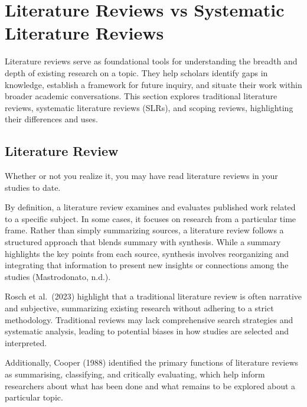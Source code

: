 \documentclass[
  letterpaper,
  DIV=11,
  numbers=noendperiod]{scrreprt}
\begin{document}

\chapter*{Literature Reviews vs Systematic Literature
Reviews}\label{literature-reviews-vs-systematic-literature-reviews}


Literature reviews serve as foundational tools for understanding the
breadth and depth of existing research on a topic. They help scholars
identify gaps in knowledge, establish a framework for future inquiry,
and situate their work within broader academic conversations. This
section explores traditional literature reviews, systematic literature
reviews (SLRs), and scoping reviews, highlighting their differences and
uses.

\section*{Literature Review}\label{literature-review}


Whether or not you realize it, you may have read literature reviews in
your studies to date.

By definition, a literature review examines and evaluates published work
related to a specific subject. In some cases, it focuses on research
from a particular time frame. Rather than simply summarizing sources, a
literature review follows a structured approach that blends summary with
synthesis. While a summary highlights the key points from each source,
synthesis involves reorganizing and integrating that information to
present new insights or connections among the studies (Mastrodonato,
n.d.).

Rosch et al.~(2023) highlight that a traditional literature review is
often narrative and subjective, summarizing existing research without
adhering to a strict methodology. Traditional reviews may lack
comprehensive search strategies and systematic analysis, leading to
potential biases in how studies are selected and interpreted.

Additionally, Cooper (1988) identified the primary functions of
literature reviews as summarising, classifying, and critically
evaluating, which help inform researchers about what has been done and
what remains to be explored about a particular topic.
\end{document}
